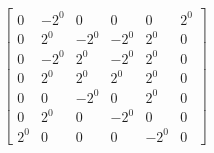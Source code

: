 \documentclass{article}%
\begin{document}
\[\left[\begin{matrix}0 & - 2^{0} & 0 & 0 & 0 & 2^{0}\\0 & 2^{0} & - 2^{0} & - 2^{0} & 2^{0} & 0\\0 & - 2^{0} & 2^{0} & - 2^{0} & 2^{0} & 0\\0 & 2^{0} & 2^{0} & 2^{0} & 2^{0} & 0\\0 & 0 & - 2^{0} & 0 & 2^{0} & 0\\0 & 2^{0} & 0 & - 2^{0} & 0 & 0\\2^{0} & 0 & 0 & 0 & - 2^{0} & 0\end{matrix}\right]%
\]%
\end{document}

